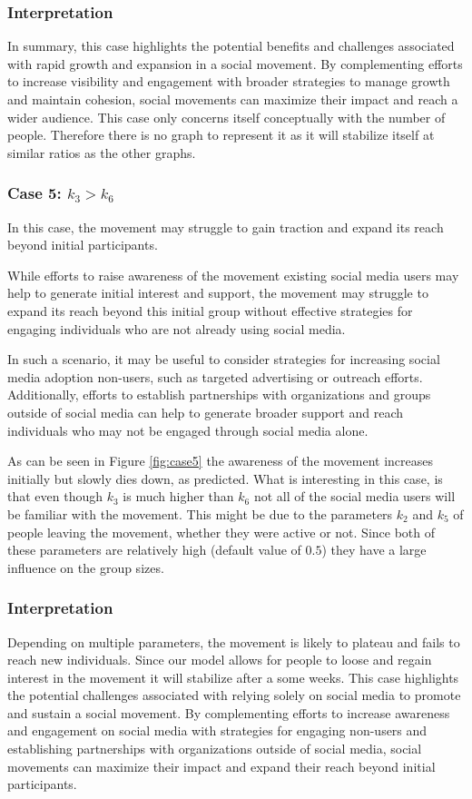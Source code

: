 \documentclass{article}
\begin{document}
    \subsubsection*{Interpretation} In summary,  this case highlights the potential benefits and challenges associated with rapid growth and expansion in a social movement. By complementing efforts to increase visibility and engagement with broader strategies to manage growth and maintain cohesion, social movements can maximize their impact and reach a wider audience.
    This case only concerns itself conceptually with the number of people. Therefore there is no graph to represent it as it will stabilize itself at similar ratios as the other graphs.

    \subsubsection*{Case 5: $k_3 > k_6$}
    In this case, the movement may struggle to gain traction and expand its reach beyond initial participants.
    
    While efforts to raise awareness of the movement  existing social media users may help to generate initial interest and support, the movement may struggle to expand its reach beyond this initial group without effective strategies for engaging individuals who are not already using social media.
    
    In such a scenario, it may be useful to consider strategies for increasing social media adoption  non-users, such as targeted advertising or outreach efforts. Additionally, efforts to establish partnerships with organizations and groups outside of social media can help to generate broader support and reach individuals who may not be engaged through social media alone.

    As can be seen in Figure \ref{fig:case5} the awareness of the movement increases initially but slowly dies down, as predicted. What is interesting in this case, is that even though $k_3$ is much higher than $k_6$ not all of the social media users will be familiar with the movement. This might be due to the parameters $k_2$ and $k_5$ of people leaving the movement, whether they were active or not. Since both of these parameters are relatively high (default value of $0.5$) they have a large influence on the group sizes. 
    
    \subsubsection*{Interpretation}
    Depending on multiple parameters, the movement is likely to plateau and fails to reach new individuals. Since our model allows for people to loose and regain interest in the movement it will stabilize after a some weeks. This case highlights the potential challenges associated with relying solely on social media to promote and sustain a social movement. By complementing efforts to increase awareness and engagement on social media with strategies for engaging non-users and establishing partnerships with organizations outside of social media, social movements can maximize their impact and expand their reach beyond initial participants.
\end{document}
